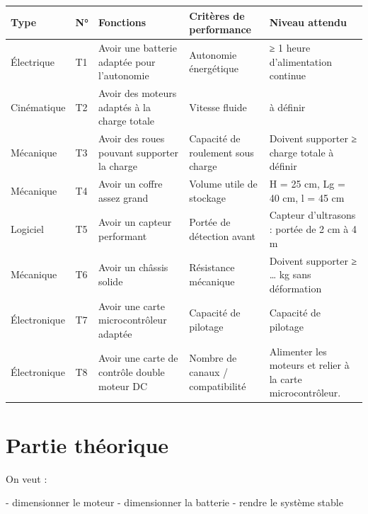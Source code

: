 \documentclass[a4paper,12pt]{report}  %
\begin{document}
{\fontsize{10pt}{12pt}\selectfont 
	\begin{longtable}{|l|l|p{4cm}|p{4cm}|p{4cm}|}
		\hline
		\textbf{Type} & \textbf{N°} & \textbf{Fonctions} 
		& \textbf{Critères de performance} & \textbf{Niveau attendu} \\
		\hline
		\endhead
		
		\hline
		\endfoot
		
		\hline
		Électrique & T1 & Avoir une batterie adaptée pour l'autonomie &
		Autonomie énergétique & ≥ 1 heure d'alimentation continue \\
		
		\hline
		Cinématique & T2 & Avoir des moteurs adaptés à la charge totale &
		Vitesse fluide & à définir \\
		
		\hline
		Mécanique & T3 & Avoir des roues pouvant supporter la charge & Capacité
		de roulement sous charge & Doivent supporter ≥ charge totale à définir \\
		
		\hline
		Mécanique & T4 & Avoir un coffre assez grand & Volume utile de stockage
		& H = 25 cm, Lg = 40 cm, l = 45 cm \\
		
		\hline
		Logiciel & T5 & Avoir un capteur performant & Portée de détection avant
		& Capteur d'ultrasons : portée de 2 cm à 4 m  \\
		
		\hline
		Mécanique & T6 & Avoir un châssis solide & Résistance mécanique &
		Doivent supporter ≥ \ldots{} kg sans déformation \\
		
		\hline
		Électronique & T7 & Avoir une carte microcontrôleur adaptée & Capacité
		de pilotage & Capacité de pilotage \\
		
		\hline
		Électronique & T8 & Avoir une carte de contrôle double moteur DC &
		Nombre de canaux / compatibilité & Alimenter les moteurs et relier à la
		carte microcontrôleur. \\
		
	\end{longtable}
}



\section{Partie théorique}

On veut : 

- dimensionner le moteur 
- dimensionner la batterie 
- rendre le système stable 
\end{document}
